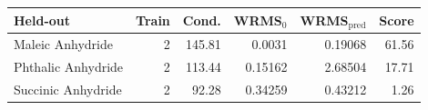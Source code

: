 \begin{tabular}{lrrrrr}
\toprule
Held-out & Train & Cond. & WRMS$_0$ & WRMS$_\mathrm{pred}$ & Score \\
\midrule
Maleic Anhydride & 2 & 145.81 & 0.0031 & 0.19068 & 61.56 \\
Phthalic Anhydride & 2 & 113.44 & 0.15162 & 2.68504 & 17.71 \\
Succinic Anhydride & 2 & 92.28 & 0.34259 & 0.43212 & 1.26 \\
\bottomrule
\end{tabular}
